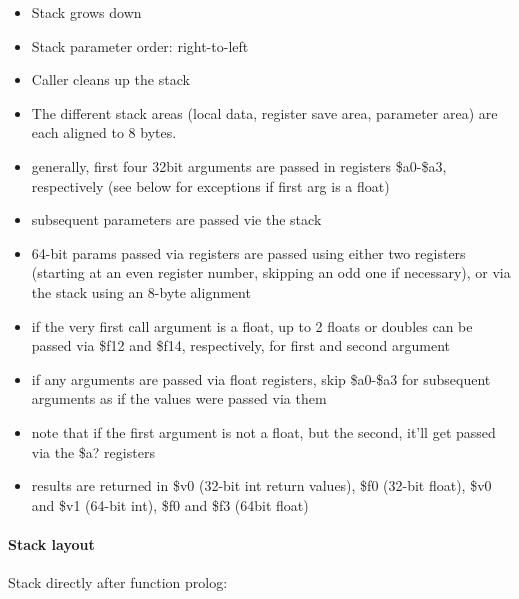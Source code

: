 \begin{itemize}
\item Stack grows down
\item Stack parameter order: right-to-left
\item Caller cleans up the stack
\item The different stack areas (local data, register save area, parameter area) are each aligned to 8 bytes.
\item generally, first four 32bit arguments are passed in registers \$a0-\$a3, respectively (see below for exceptions if first arg is a float)
\item subsequent parameters are passed vie the stack
\item 64-bit params passed via registers are passed using either two registers (starting at an even register number, skipping an odd one if necessary), or via the stack using an 8-byte alignment
\item if the very first call argument is a float, up to 2 floats or doubles can be passed via \$f12 and \$f14, respectively, for first and second argument
\item if any arguments are passed via float registers, skip \$a0-\$a3 for subsequent arguments as if the values were passed via them
\item note that if the first argument is not a float, but the second, it'll get passed via the \$a? registers
\item results are returned in \$v0 (32-bit int return values), \$f0 (32-bit float), \$v0 and \$v1 (64-bit int), \$f0 and \$f3 (64bit float)
\end{itemize}

\paragraph{Stack layout}

Stack directly after function prolog:\\

